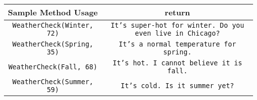 \documentclass[12pt]{article}
\begin{document}
\begin{center}
\begin{tabular}{| c | c |}
\hline\rule{0pt}{4ex}
Sample Method Usage & return \\
\hline\rule{0pt}{4ex}
\texttt{WeatherCheck(Winter, 72)} & \texttt{It's super-hot for winter. Do you even live in Chicago?}\\
\hline\rule{0pt}{4ex}
\texttt{WeatherCheck(Spring, 35)} & \texttt{It's a normal temperature for spring.}\\
\hline\rule{0pt}{4ex}
\texttt{WeatherCheck(Fall, 68)} & \texttt{It's hot. I cannot believe it is fall.}\\
\hline\rule{0pt}{4ex}
\texttt{WeatherCheck(Summer, 59)} & \texttt{It's cold. Is it summer yet?}\\
\hline
\end{tabular}
\end{center}
\end{document}
